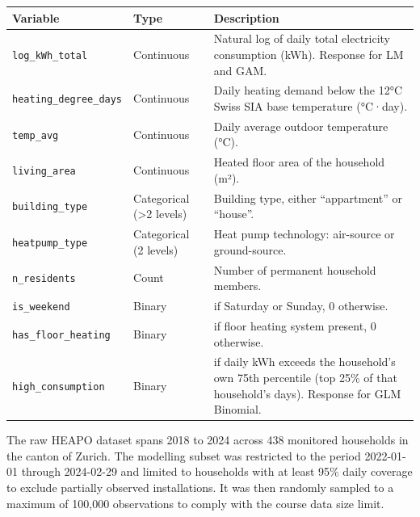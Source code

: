 \documentclass[
]{article}
\newcounter{none} %
\begin{document}
{\def\LTcaptype{none} %
\begin{longtable}[]{@{}
  >{\raggedright\arraybackslash}p{}
  >{\raggedright\arraybackslash}p{}
  >{\raggedright\arraybackslash}p{}@{}}
\toprule\noalign{}
\begin{minipage}[b]{\linewidth}\raggedright
Variable
\end{minipage} & \begin{minipage}[b]{\linewidth}\raggedright
Type
\end{minipage} & \begin{minipage}[b]{\linewidth}\raggedright
Description
\end{minipage} \\
\midrule\noalign{}
\endhead
\bottomrule\noalign{}
\endlastfoot
\texttt{log\_kWh\_total} & Continuous & Natural log of daily total
electricity consumption (kWh). Response for LM and GAM. \\
\texttt{heating\_degree\_days} & Continuous & Daily heating demand below
the 12°C Swiss SIA base temperature (°C·day). \\
\texttt{temp\_avg} & Continuous & Daily average outdoor temperature
(°C). \\
\texttt{living\_area} & Continuous & Heated floor area of the household
(m²). \\
\texttt{building\_type} & Categorical (\textgreater2 levels) & Building
type, either ``appartment'' or ``house''. \\
\texttt{heatpump\_type} & Categorical (2 levels) & Heat pump technology:
air-source or ground-source. \\
\texttt{n\_residents} & Count & Number of permanent household
members. \\
\texttt{is\_weekend} & Binary & 1 if Saturday or Sunday, 0 otherwise. \\
\texttt{has\_floor\_heating} & Binary & 1 if floor heating system
present, 0 otherwise. \\
\texttt{high\_consumption} & Binary & 1 if daily kWh exceeds the
household's own 75th percentile (top 25\% of that household's days).
Response for GLM Binomial. \\
\end{longtable}
}

The raw HEAPO dataset spans 2018 to 2024 across 438 monitored households
in the canton of Zurich. The modelling subset was restricted to the
period 2022-01-01 through 2024-02-29 and limited to households with at
least 95\% daily coverage to exclude partially observed installations.
It was then randomly sampled to a maximum of 100,000 observations to
comply with the course data size limit.
\end{document}
